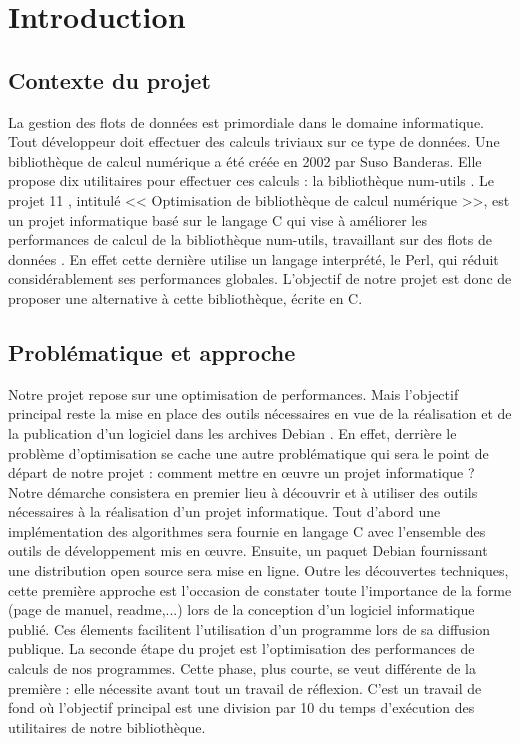 \chapter{Introduction}
\label{chap:introduction}

\section{Contexte du projet }

La gestion des flots de donn\'ees est primordiale dans le domaine informatique. Tout d\'eveloppeur doit effectuer des calculs triviaux sur ce type de donn\'ees. Une 
biblioth\`eque de calcul num\'erique a \'et\'e cr\'e\'ee en 2002 par Suso Banderas. Elle propose dix utilitaires pour effectuer ces calculs : la biblioth\`eque num-utils \citep{numutils}.
\newline
Le projet 11 \citep{projet11}, intitul\'e << Optimisation de biblioth\`eque de calcul num\'erique >>, est  un projet informatique bas\'e sur le langage C qui vise \`a 
am\'eliorer les performances de calcul de la biblioth\`eque num-utils, travaillant sur des flots de donn\'ees \citep{dataflux}. En effet cette derni\`ere utilise un langage interpr\'et\'e, le Perl, qui r\'eduit consid\'erablement ses performances globales. 
\newline
L'objectif de notre projet est donc de proposer une alternative \`a cette biblioth\`eque, \'ecrite en C.

\section{Probl\'ematique et approche}

Notre projet repose sur une optimisation de performances. Mais l'objectif principal reste la mise en place des outils n\'ecessaires en vue de la 
r\'ealisation et de la publication d'un logiciel dans les archives Debian \citep{debian}.
En effet, derri\`ere le probl\`eme d'optimisation se cache une autre probl\'ematique qui sera le point de d\'epart de notre projet : comment mettre
en \oe{}uvre un projet informatique ?
Notre d\'emarche consistera en premier lieu \`a d\'ecouvrir et \`a utiliser des outils n\'ecessaires \`a la r\'ealisation d'un projet informatique.
\newline
Tout d'abord une impl\'ementation des algorithmes sera fournie en langage C avec l'ensemble des outils de d\'eveloppement mis en \oe{}uvre. Ensuite, 
un paquet Debian fournissant une distribution open source sera mise en ligne. 
Outre les d\'ecouvertes techniques, cette premi\`ere approche est l'occasion de constater toute l'importance de la forme (page de manuel, readme,...) 
lors de la conception d'un logiciel informatique publi\'e. Ces \'elements facilitent l'utilisation d'un programme lors de sa diffusion publique.
\newline
La seconde \'etape du projet est l'optimisation des performances de calculs de nos programmes. Cette phase, plus courte, se veut diff\'erente de la 
premi\`ere : elle n\'ecessite avant tout un travail de r\'eflexion. C'est  un travail de fond o\`u l'objectif principal est une division par 10 du temps
d'ex\'ecution des utilitaires de notre biblioth\`eque.

